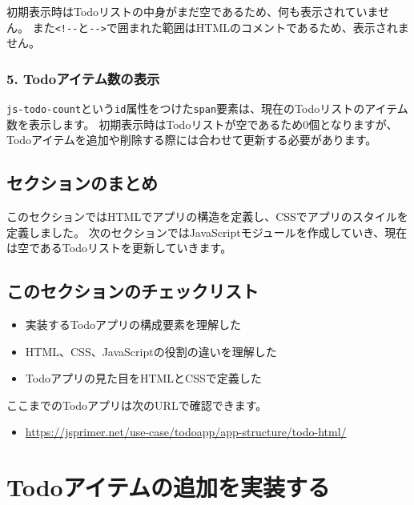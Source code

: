 初期表示時はTodoリストの中身がまだ空であるため、何も表示されていません。
また\texttt{<!-\/-}と\texttt{-\/->}で囲まれた範囲はHTMLのコメントであるため、表示されません。

\hypertarget{comment-todo-count}{%
\subsubsection{5. Todoアイテム数の表示}\label{comment-todo-count}}

\texttt{js-todo-count}という\texttt{id}属性をつけた\texttt{span}要素は、現在のTodoリストのアイテム数を表示します。
初期表示時はTodoリストが空であるため0個となりますが、Todoアイテムを追加や削除する際には合わせて更新する必要があります。

\hypertarget{conclusion}{%
\subsection{セクションのまとめ}\label{conclusion}}

このセクションではHTMLでアプリの構造を定義し、CSSでアプリのスタイルを定義しました。
次のセクションではJavaScriptモジュールを作成していき、現在は空であるTodoリストを更新していきます。

\hypertarget{section-checklist}{%
\subsection{このセクションのチェックリスト}\label{section-checklist}}

\begin{itemize}
\item
  実装するTodoアプリの構成要素を理解した
\item
  HTML、CSS、JavaScriptの役割の違いを理解した
\item
  Todoアプリの見た目をHTMLとCSSで定義した
\end{itemize}

ここまでのTodoアプリは次のURLで確認できます。

\begin{itemize}
\item
  \url{https://jsprimer.net/use-case/todoapp/app-structure/todo-html/}
\end{itemize}

\hypertarget{form-event}{%
\section{Todoアイテムの追加を実装する}\label{form-event}}


